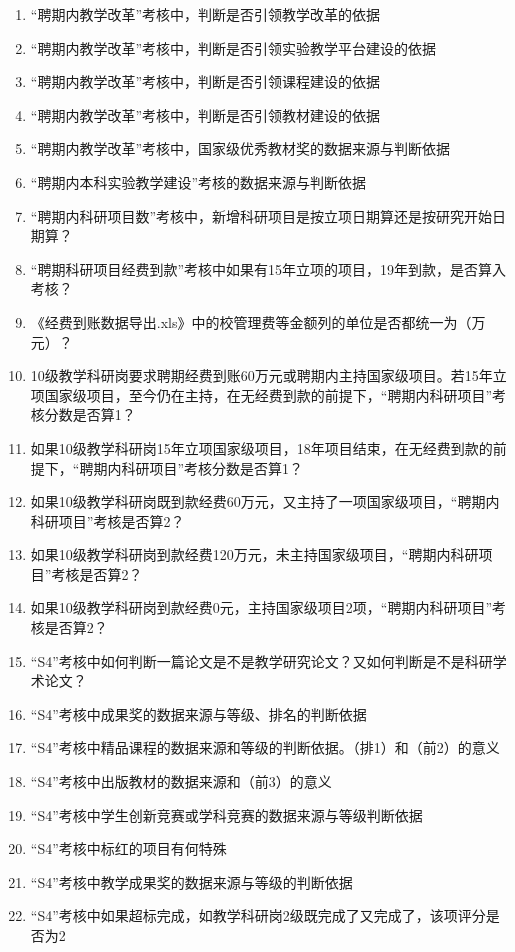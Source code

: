 \documentclass[UTF8,fontset=windowsnew]{ctexart}
\newcommand*\circled[1]{\tikz[baseline=(char.base)]{\node[shape=circle,draw,inner sep=2pt] (char) {#1};}}
\begin{document}
\begin{enumerate}
  \item ``聘期内教学改革''考核中，判断是否引领教学改革的依据
  \item ``聘期内教学改革''考核中，判断是否引领实验教学平台建设的依据
  \item ``聘期内教学改革''考核中，判断是否引领课程建设的依据
  \item ``聘期内教学改革''考核中，判断是否引领教材建设的依据
  \item ``聘期内教学改革''考核中，国家级优秀教材奖的数据来源与判断依据
  \item ``聘期内本科实验教学建设''考核的数据来源与判断依据
  \item ``聘期内科研项目数''考核中，新增科研项目是按立项日期算还是按研究开始日期算？
  \item ``聘期科研项目经费到款''考核中如果有15年立项的项目，19年到款，是否算入考核？
  \item 《经费到账数据导出.xls》中的校管理费等金额列的单位是否都统一为（万元）？
  \item 10级教学科研岗要求聘期经费到账60万元或聘期内主持国家级项目。若15年立项国家级项目，至今仍在主持，在无经费到款的前提下，``聘期内科研项目''考核分数是否算1？
  \item 如果10级教学科研岗15年立项国家级项目，18年项目结束，在无经费到款的前提下，``聘期内科研项目''考核分数是否算1？
  \item 如果10级教学科研岗既到款经费60万元，又主持了一项国家级项目，``聘期内科研项目''考核是否算2？
  \item 如果10级教学科研岗到款经费120万元，未主持国家级项目，``聘期内科研项目''考核是否算2？
  \item 如果10级教学科研岗到款经费0元，主持国家级项目2项，``聘期内科研项目''考核是否算2？
  \item ``S4''考核中如何判断一篇论文是不是教学研究论文？又如何判断是不是科研学术论文？
  \item ``S4''考核中成果奖的数据来源与等级、排名的判断依据
  \item ``S4''考核中精品课程的数据来源和等级的判断依据。（排1）和（前2）的意义
  \item ``S4''考核中出版教材的数据来源和（前3）的意义
  \item ``S4''考核中学生创新竞赛或学科竞赛的数据来源与等级判断依据
  \item ``S4''考核中标红的项目有何特殊
  \item ``S4''考核中教学成果奖的数据来源与等级的判断依据
  \item ``S4''考核中如果超标完成，如教学科研岗2级既完成了\circled{1}又完成了\circled{2}，该项评分是否为2

\end{enumerate}
\end{document}
